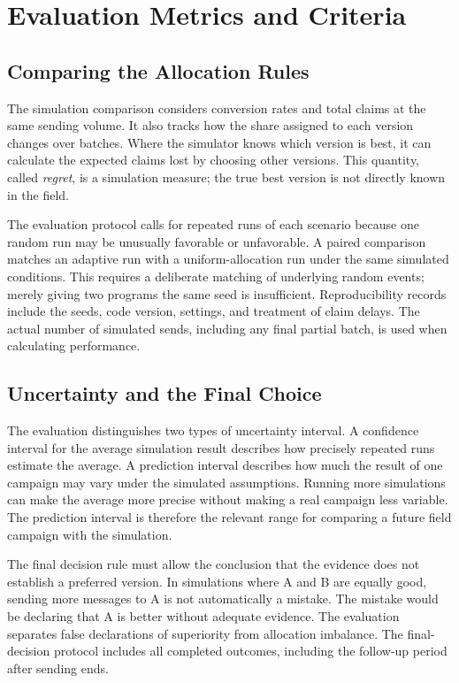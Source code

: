 \section{Evaluation Metrics and Criteria}
\label{sec:method_evaluation}

\subsection{Comparing the Allocation Rules}

The simulation comparison considers conversion rates and total claims at the same sending volume. It also tracks how the share assigned to each version changes over batches. Where the simulator knows which version is best, it can calculate the expected claims lost by choosing other versions. This quantity, called \emph{regret}, is a simulation measure; the true best version is not directly known in the field.

The evaluation protocol calls for repeated runs of each scenario because one random run may be unusually favorable or unfavorable. A paired comparison matches an adaptive run with a uniform-allocation run under the same simulated conditions. This requires a deliberate matching of underlying random events; merely giving two programs the same seed is insufficient. Reproducibility records include the seeds, code version, settings, and treatment of claim delays. The actual number of simulated sends, including any final partial batch, is used when calculating performance.

\subsection{Uncertainty and the Final Choice}

The evaluation distinguishes two types of uncertainty interval. A confidence interval for the average simulation result describes how precisely repeated runs estimate the average. A prediction interval describes how much the result of one campaign may vary under the simulated assumptions. Running more simulations can make the average more precise without making a real campaign less variable. The prediction interval is therefore the relevant range for comparing a future field campaign with the simulation.

The final decision rule must allow the conclusion that the evidence does not establish a preferred version. In simulations where A and B are equally good, sending more messages to A is not automatically a mistake. The mistake would be declaring that A is better without adequate evidence. The evaluation separates false declarations of superiority from allocation imbalance. The final-decision protocol includes all completed outcomes, including the follow-up period after sending ends.

